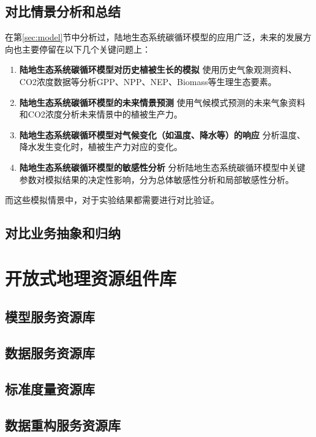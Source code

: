 \subsection{对比情景分析和总结}
在第\ref{sec:model}节中分析过，陆地生态系统碳循环模型的应用广泛，未来的发展方向也主要停留在以下几个关键问题上：
\begin{enumerate}[(1)]
\item \textbf{陆地生态系统碳循环模型对历史植被生长的模拟}
使用历史气象观测资料、CO2浓度数据等分析GPP、NPP、NEP、Biomass等生理生态要素。

\item \textbf{陆地生态系统碳循环模型的未来情景预测}
使用气候模式预测的未来气象资料和CO2浓度分析未来情景中的植被生产力。

\item \textbf{陆地生态系统碳循环模型对气候变化（如温度、降水等）的响应}
分析温度、降水发生变化时，植被生产力对应的变化。

\item \textbf{陆地生态系统碳循环模型的敏感性分析}
分析陆地生态系统碳循环模型中关键参数对模拟结果的决定性影响，分为总体敏感性分析和局部敏感性分析。

\end{enumerate}

而这些模拟情景中，对于实验结果都需要进行对比验证。

\subsection{对比业务抽象和归纳}


\section{开放式地理资源组件库}
\subsection{模型服务资源库}
\subsection{数据服务资源库}
\subsection{标准度量资源库}
\subsection{数据重构服务资源库}
